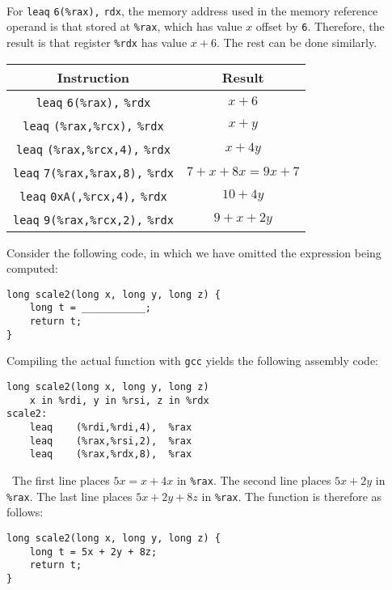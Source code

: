 \documentclass[12pt]{article}
\newenvironment{ex}[2][Exercise]{\begin{trivlist}
		\item[\hskip \labelsep {\bfseries #1}\hskip \labelsep {\bfseries #2.}]}{\end{trivlist}}
\newenvironment{sol}[1][Solution]{\begin{trivlist}
		\item[\hskip \labelsep {\bfseries #1:}]}{\end{trivlist}}
\begin{document}
{\begin{sol}
	\
	
	For \texttt{leaq} \texttt{6(\%rax),} \texttt{rdx}, the memory address used in the memory
	reference operand is that stored at \texttt{\%rax}, which has value $x$ offset by \texttt{6}.
	Therefore, the result is that register \texttt{\%rdx} has value $x+6$. The rest can be done
	similarly.
	\begin{center}
		\begin{tabular}{cc}
			Instruction & Result\\
			\hline
			\texttt{leaq} \texttt{6(\%rax),} \texttt{\%rdx} & $x+6$\\
			\texttt{leaq} \texttt{(\%rax,\%rcx),} \texttt{\%rdx} & $x+y$\\
			\texttt{leaq} \texttt{(\%rax,\%rcx,4),} \texttt{\%rdx} & $x+4y$\\
			\texttt{leaq} \texttt{7(\%rax,\%rax,8),} \texttt{\%rdx} & $7+x+8x=9x+7$\\
			\texttt{leaq} \texttt{0xA(,\%rcx,4),} \texttt{\%rdx} & $10+4y$\\
			\texttt{leaq} \texttt{9(\%rax,\%rcx,2),} \texttt{\%rdx} & $9+x+2y$
		\end{tabular}
	\end{center}
\end{sol}

\begin{ex}{3.7}
	Consider the following code, in which we have omitted the expression being computed:
	
	\begin{lstlisting}
long scale2(long x, long y, long z) {
	long t = ___________;
	return t;
}
	\end{lstlisting}
	Compiling the actual function with \texttt{gcc} yields the following assembly code:
	\begin{lstlisting}[language={}]
	long scale2(long x, long y, long z)
	x in %rdi, y in %rsi, z in %rdx
scale2:
	leaq	(%rdi,%rdi,4),	%rax
	leaq	(%rax,%rsi,2),	%rax
	leaq	(%rax,%rdx,8),	%rax
	\end{lstlisting}
\end{ex}

\begin{sol}
	\
	The first line places $5x=x+4x$ in \texttt{\%rax}. The second line places $5x+2y$ in
	\texttt{\%rax}. The last line places $5x+2y+8z$ in \texttt{\%rax}. The function is therefore as follows:
	\begin{lstlisting}
long scale2(long x, long y, long z) {
	long t = 5x + 2y + 8z;
	return t;
}
	\end{lstlisting}
\end{sol}
\end{document}
